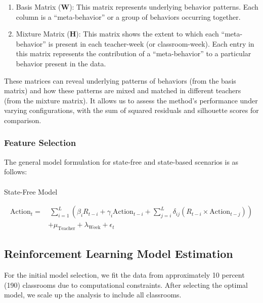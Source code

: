 \documentclass[
  number,
  preprint,
  3p,
  onecolumn]{elsarticle}
\makeatletter
\let\oldparagraph\paragraph
\renewcommand{\paragraph}{
    \@ifstar
      \xxxParagraphStar
      \xxxParagraphNoStar
  }
\newcommand{\xxxParagraphStar}[1]{\oldparagraph*{#1}\mbox{}}
\newcommand{\xxxParagraphNoStar}[1]{\oldparagraph{#1}\mbox{}}
\providecommand{\tightlist}{%
  \setlength{\itemsep}{0pt}\setlength{\parskip}{0pt}}\usepackage{longtable,booktabs,array}
\makeatother
\begin{document}
\begin{enumerate}
\def\labelenumi{\arabic{enumi}.}
\tightlist
\item
  Basis Matrix (\(\mathbf{W}\)): This matrix represents underlying
  behavior patterns. Each column is a ``meta-behavior'' or a group of
  behaviors occurring together.
\item
  Mixture Matrix (\(\mathbf{H}\)): This matrix shows the extent to which
  each ``meta-behavior'' is present in each teacher-week (or
  classroom-week). Each entry in this matrix represents the contribution
  of a ``meta-behavior'' to a particular behavior present in the data.
\end{enumerate}

These matrices can reveal underlying patterns of behaviors (from the
basis matrix) and how these patterns are mixed and matched in different
teachers (from the mixture matrix). It allows us to assess the method's
performance under varying configurations, with the sum of squared
residuals and silhouette scores for comparison.

\subsubsection{Feature Selection}\label{feature-selection-1}

The general model formulation for state-free and state-based scenarios
is as follows:

\paragraph{State-Free Model}\label{state-free-model}

\begin{align*}
\text{Action}_t =& \ \sum_{i=1}^{L} \left( \beta_{i} R_{t-i} + \gamma_i \text{Action}_{t-i} + \sum_{j=i}^{L} \delta_{ij} (R_{t-i} \times \text{Action}_{t-j}) \right) \\
& + \mu_{\text{Teacher}} + \lambda_{\text{Week}} + \epsilon_t
\end{align*}

\subsection{Reinforcement Learning Model
Estimation}\label{reinforcement-learning-model-estimation}

For the initial model selection, we fit the data from approximately 10
percent (190) classrooms due to computational constraints. After
selecting the optimal model, we scale up the analysis to include all
classrooms.
\end{document}
